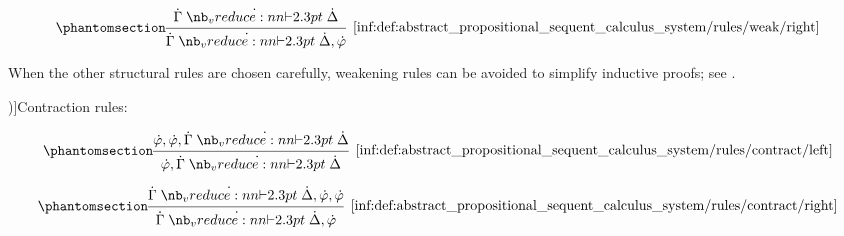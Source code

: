 \begin{definition}
\begin{thmenum}
\begin{paracol}{2}
      \begin{rightcolumn}
        \ParacolAlignmentHack
        \begin{equation*}\taglabel[\ensuremath{ \logic{Weak}_R }]{inf:def:abstract_propositional_sequent_calculus_system/rules/weak/right}
          \begin{prooftree}
            \hypo{ \syn\Gamma \synvdash \syn\Delta }
            \infer1[\ref{inf:def:abstract_propositional_sequent_calculus_system/rules/weak/right}]{ \syn\Gamma \synvdash \syn\Delta, \syn\varphi }
          \end{prooftree}
        \end{equation*}
      \end{rightcolumn}
    \end{paracol}

    When the other structural rules are chosen carefully, weakening rules can be avoided to simplify inductive proofs; see \cite{CST:weakening_rule_for_lambda_cube}.

     \term[ru=правила сокращения (\cite[218]{КолмогоровДрагалин2006Логика})]{Contraction rules}:
    \begin{paracol}{2}
      \begin{leftcolumn}
        \ParacolAlignmentHack
        \begin{equation*}\taglabel[\ensuremath{ \logic{Contr}_L }]{inf:def:abstract_propositional_sequent_calculus_system/rules/contract/left}
          \begin{prooftree}
            \hypo{ \syn\varphi, \syn\varphi, \syn\Gamma \synvdash \syn\Delta }
            \infer1[\ref{inf:def:abstract_propositional_sequent_calculus_system/rules/contract/left}]{ \syn\varphi, \syn\Gamma \synvdash \syn\Delta }
          \end{prooftree}
        \end{equation*}
      \end{leftcolumn}

      \begin{rightcolumn}
        \ParacolAlignmentHack
        \begin{equation*}\taglabel[\ensuremath{ \logic{Contr}_R }]{inf:def:abstract_propositional_sequent_calculus_system/rules/contract/right}
          \begin{prooftree}
            \hypo{ \syn\Gamma \synvdash \syn\Delta, \syn\varphi, \syn\varphi }
            \infer1[\ref{inf:def:abstract_propositional_sequent_calculus_system/rules/contract/right}]{ \syn\Gamma \synvdash \syn\Delta, \syn\varphi }
          \end{prooftree}
        \end{equation*}
      \end{rightcolumn}
    \end{paracol}


\end{thmenum}
\end{definition}
